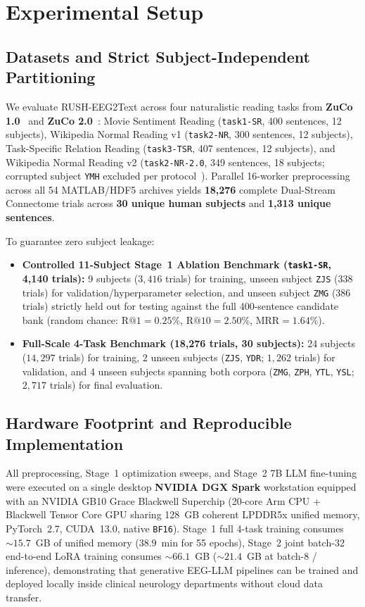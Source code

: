 \documentclass[journal]{IEEEtran}
\begin{document}
\section{Experimental Setup}

\subsection{Datasets and Strict Subject-Independent Partitioning}
We evaluate RUSH-EEG2Text across four naturalistic reading tasks from \textbf{ZuCo 1.0}~\cite{hollenstein2018zuco} and \textbf{ZuCo 2.0}~\cite{hollenstein2020zuco2}: Movie Sentiment Reading (\texttt{task1-SR}, 400 sentences, 12 subjects), Wikipedia Normal Reading v1 (\texttt{task2-NR}, 300 sentences, 12 subjects), Task-Specific Relation Reading (\texttt{task3-TSR}, 407 sentences, 12 subjects), and Wikipedia Normal Reading v2 (\texttt{task2-NR-2.0}, 349 sentences, 18 subjects; corrupted subject \texttt{YMH} excluded per protocol~\cite{wang2024cetmae}). Parallel 16-worker preprocessing across all 54 MATLAB/HDF5 archives yields \textbf{18,276} complete Dual-Stream Connectome trials across \textbf{30 unique human subjects} and \textbf{1,313 unique sentences}.

To guarantee zero subject leakage:
\begin{itemize}
    \item \textbf{Controlled 11-Subject Stage~1 Ablation Benchmark (\texttt{task1-SR}, 4,140 trials):} 9 subjects ($3,416$ trials) for training, unseen subject \texttt{ZJS} ($338$ trials) for validation/hyperparameter selection, and unseen subject \texttt{ZMG} ($386$ trials) strictly held out for testing against the full 400-sentence candidate bank (random chance: $\text{R@1} = 0.25\%$, $\text{R@10} = 2.50\%$, $\text{MRR} = 1.64\%$).
    \item \textbf{Full-Scale 4-Task Benchmark (18,276 trials, 30 subjects):} 24 subjects ($14,297$ trials) for training, 2 unseen subjects (\texttt{ZJS}, \texttt{YDR}; $1,262$ trials) for validation, and 4 unseen subjects spanning both corpora (\texttt{ZMG}, \texttt{ZPH}, \texttt{YTL}, \texttt{YSL}; $2,717$ trials) for final evaluation.
\end{itemize}

\subsection{Hardware Footprint and Reproducible Implementation}
All preprocessing, Stage~1 optimization sweeps, and Stage~2 7B LLM fine-tuning were executed on a single desktop \textbf{NVIDIA DGX Spark} workstation equipped with an NVIDIA GB10 Grace Blackwell Superchip (20-core Arm CPU + Blackwell Tensor Core GPU sharing 128~GB coherent LPDDR5x unified memory, PyTorch~2.7, CUDA~13.0, native \texttt{BF16}). Stage~1 full 4-task training consumes $\sim 15.7$~GB of unified memory ($38.9$~min for 55 epochs), Stage~2 joint batch-32 end-to-end LoRA training consumes $\sim 66.1$~GB ($\sim 21.4$~GB at batch-8 / inference), demonstrating that generative EEG-LLM pipelines can be trained and deployed locally inside clinical neurology departments without cloud data transfer.
\end{document}
